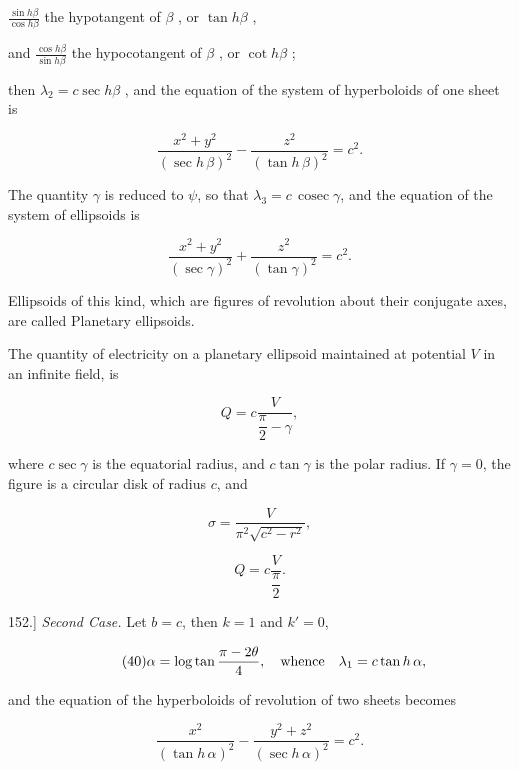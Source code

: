 \documentclass[11pt,a4paper]{article}
\begin{document}
 $\frac{\sin h \beta}{\cos h \beta}$  the hypotangent of  $\beta$ , or  $\tan h \beta$ ,

and  $\frac{\cos h \beta}{\sin h \beta}$  the hypocotangent of  $\beta$ , or  $\cot h \beta$ ;

then  $\lambda_2 = c \sec h \beta$ , and the equation of the system of hyperboloids of one sheet is

\begin{equation}\tag{35}
\frac{x^2+y^2}{(\sec h\,\beta)^2}-\frac{z^2}{(\tan h\,\beta)^2}=c^2.
\end{equation}

The quantity $\gamma$ is reduced to $\psi$, so that $\lambda_3=c\,\operatorname{cosec}\gamma$, and the equation of the system of ellipsoids is

\begin{equation}\tag{36}
\frac{x^2+y^2}{(\sec\gamma)^2}+\frac{z^2}{(\tan\gamma)^2}=c^2.
\end{equation}

Ellipsoids of this kind, which are figures of revolution about their conjugate axes, are called Planetary ellipsoids.

The quantity of electricity on a planetary ellipsoid maintained at potential $V$ in an infinite field, is

\begin{equation}\tag{37}
Q=c\frac{V}{\dfrac{\pi}{2}-\gamma},
\end{equation}

where $c\sec\gamma$ is the equatorial radius, and $c\tan\gamma$ is the polar radius. If $\gamma=0$, the figure is a circular disk of radius $c$, and

\begin{equation}\tag{38}
\sigma=\frac{V}{\pi^2\sqrt{c^2-r^2}},
\end{equation}

\begin{equation}\tag{39}
Q=c\frac{V}{\dfrac{\pi}{2}}.
\end{equation}

152.] \emph{Second Case.} Let $b=c$, then $k=1$ and $k'=0$,

\begin{equation}\tag{40}
\alpha=\log\tan\frac{\pi-2\theta}{4},\quad\hbox{whence}\quad
\lambda_1=c\tan h\,\alpha,
\end{equation}

and the equation of the hyperboloids of revolution of two sheets becomes

\begin{equation}\tag{41}
\frac{x^2}{(\tan h\,\alpha)^2}
-\frac{y^2+z^2}{(\sec h\,\alpha)^2}=c^2.
\end{equation}
\end{document}

